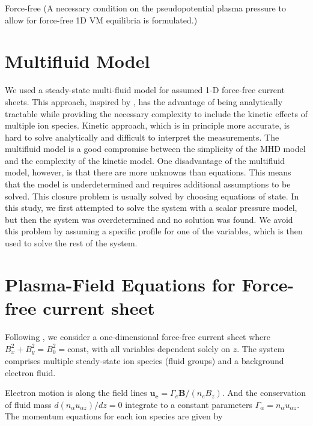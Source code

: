 \documentclass[
  letterpaper,
  DIV=11,
  numbers=noendperiod]{scrartcl}
\begin{document}
Force-free \citet{harrisonRemarksOnedimensionalForcefree2009} (A necessary condition on the pseudopotential plasma pressure to allow for force-free 1D VM equilibria is formulated.)

\section{Multifluid Model}\label{multifluid-model}

We used a steady-state multi-fluid model for assumed 1-D force-free current sheets. This approach, inspired by \citet{steinhauerMultifluidModelOnedimensional2008}, has the advantage of being analytically tractable while providing the necessary complexity to include the kinetic effects of multiple ion species. Kinetic approach, which is in principle more accurate, is hard to solve analytically and difficult to interpret the measurements. The multifluid model is a good compromise between the simplicity of the MHD model and the complexity of the kinetic model. One disadvantage of the multifluid model, however, is that there are more unknowns than equations. This means that the model is underdetermined and requires additional assumptions to be solved. This closure problem is usually solved by choosing equations of state. In this study, we first attempted to solve the system with a scalar pressure model, but then the system was overdetermined and no solution was found. We avoid this problem by assuming a specific profile for one of the variables, which is then used to solve the rest of the system.

\section{Plasma-Field Equations for Force-free current sheet}\label{plasma-field-equations-for-force-free-current-sheet}

Following \citet{steinhauerMultifluidModelOnedimensional2008}, we consider a one-dimensional force-free current sheet where \(B_x^2 + B_y^2 = B_0^2 = \text{const}\), with all variables dependent solely on \(z\). The system comprises multiple steady-state ion species (fluid groups) and a background electron fluid.

Electron motion is along the field lines \(\mathbf{u_e} = Γ_e \mathbf{B} / (n_e B_z)\). And the conservation of fluid mass \(d(n_α u_{αz})/dz = 0\) integrate to a constant parameters \(Γ_α = n_α u_{αz}\). The momentum equations for each ion species are given by
\end{document}
